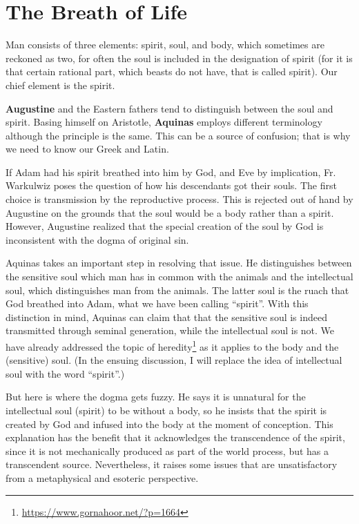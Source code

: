 \section{The Breath of Life}

\begin{quotex}
Man consists of three elements: spirit, soul, and body, which sometimes are reckoned as two, for often the soul is included in the designation of spirit (for it is that certain rational part, which beasts do not have, that is called spirit). Our chief element is the spirit. 

\end{quotex}
\textbf{Augustine} and the Eastern fathers tend to distinguish between the soul and spirit. Basing himself on Aristotle, \textbf{Aquinas} employs different terminology although the principle is the same. This can be a source of confusion; that is why we need to know our Greek and Latin.

If Adam had his spirit breathed into him by God, and Eve by implication, Fr. Warkulwiz poses the question of how his descendants got their souls. The first choice is transmission by the reproductive process. This is rejected out of hand by Augustine on the grounds that the soul would be a body rather than a spirit. However, Augustine realized that the special creation of the soul by God is inconsistent with the dogma of original sin.

Aquinas takes an important step in resolving that issue. He distinguishes between the sensitive soul which man has in common with the animals and the intellectual soul, which distinguishes man from the animals. The latter soul is the ruach that God breathed into Adam, what we have been calling “spirit”. With this distinction in mind, Aquinas can claim that that the sensitive soul is indeed transmitted through seminal generation, while the intellectual soul is not. We have already addressed the topic of heredity\footnote{\url{https://www.gornahoor.net/?p=1664}} as it applies to the body and the (sensitive) soul. (In the ensuing discussion, I will replace the idea of intellectual soul with the word “spirit”.)

But here is where the dogma gets fuzzy. He says it is unnatural for the intellectual soul (spirit) to be without a body, so he insists that the spirit is created by God and infused into the body at the moment of conception. This explanation has the benefit that it acknowledges the transcendence of the spirit, since it is not mechanically produced as part of the world process, but has a transcendent source. Nevertheless, it raises some issues that are unsatisfactory from a metaphysical and esoteric perspective.

